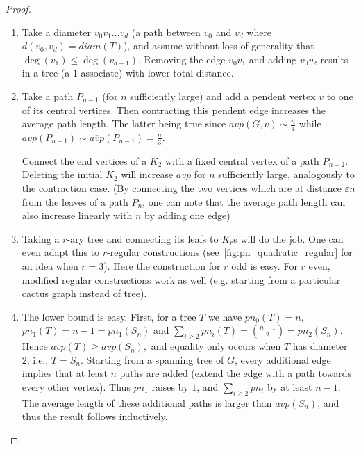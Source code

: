 \documentclass[a4paper,11pt]{article}
\newcommand{\eps}{\varepsilon}
\newcommand*{\avp}{avp}
\newcommand{\diam}{diam}
\newcommand{\pn}{pn}
\begin{document}
\begin{proof}
\begin{enumerate}
\begin{figure}[ht]
    \caption{A graph where the maximum local average path length $\avp(G,v)$ appears in a vertex of degree $b+2.$}
\end{figure}

    \item Take a diameter $v_0v_1 \ldots v_d$ (a path between $v_0$ and $v_d$ where $d(v_0,v_d)=\diam(T)$), and assume without loss of generality that $\deg(v_1) \le \deg(v_{d-1}).$
    Removing the edge $v_0v_1$ and adding $v_0v_2$ results in a tree (a $1$-associate) with lower total distance.
    \item Take a path $P_{n-1}$ (for $n$ sufficiently large) and add a pendent vertex $v$ to one of its central vertices. Then contracting this pendent edge increases the average path length. The latter being true since $\avp(G,v) \sim \frac n4$ while $\avp(P_{n-1}) \sim \overline{\avp}(P_{n-1})=\frac n3.$

    Connect the end vertices of a $K_2$ with a fixed central vertex of a path $P_{n-2}$. Deleting the initial $K_2$ will increase $\avp$ for $n$ sufficiently large, analogously to the contraction case. 
    (By connecting the two vertices which are at distance $\eps n$ from the leaves of a path $P_n$, one can note that the average path length can also increase linearly with $n$ by adding one edge)
    
    \item Taking a $r$-ary tree and connecting its leafs to $K_r$s will do the job.
    One can even adapt this to $r$-regular constructions (see~\cref{fig:pn_quadratic_regular} for an idea when $r=3$). Here the construction for $r$ odd is easy. For $r$ even, modified regular constructions work as well (e.g. starting from a particular cactus graph instead of tree).
    
    \item The lower bound is easy.
    First, for a tree $T$ we have $\pn_0(T)=n,$ $\pn_1(T) = n-1=\pn_1(S_n)$ and $\sum_{i \ge 2} \pn_i(T) = \binom{n-1}{2}=\pn_2(S_n)$. Hence $\avp(T) \ge \avp(S_n),$ and equality only occurs when $T$ has diameter $2$, i.e., $T=S_n.$
    Starting from a spanning tree of $G$, every additional edge implies that at least $n$ paths are added (extend the edge with a path towards every other vertex).
    Thus $\pn_1$ raises by $1$, and $\sum_{i \ge 2} \pn_i$ by at least $n-1$.
    The average length of these additional paths is larger than $\avp(S_n)$, and thus the result follows inductively.
    

\end{enumerate}
\end{proof}
\end{document}
